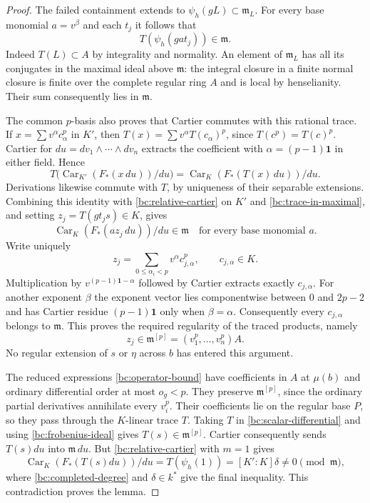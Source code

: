 \begin{proof}
The failed containment extends to
$\psi_h(gL)\subset\mathfrak m_L$.  For every base monomial $a=v^\beta$
and each $t_j$ it follows that
\begin{equation}\label{bc:trace-in-maximal}
                       T(\psi_h(gat_j))\in\mathfrak m.
\end{equation}
Indeed $T(L)\subset A$ by integrality and normality.  An element of
$\mathfrak m_L$ has all its conjugates in the maximal ideal above
$\mathfrak m$: the integral closure in a finite normal closure is
finite over the complete regular ring $A$ and is local by henselianity.
Their sum consequently
lies in $\mathfrak m$.

The common $p$-basis also proves that Cartier commutes with this rational
trace.  If $x=\sum v^\alpha c_\alpha^p$ in $K'$, then
$T(x)=\sum v^\alpha T(c_\alpha)^p$, since $T(c^p)=T(c)^p$.
Cartier for $du=dv_1\wedge\cdots\wedge dv_n$ extracts the coefficient
with $\alpha=(p-1)\mathbf1$ in either field.  Hence
\[
 T\bigl(\operatorname{Car}_{K'}(F_*(x\,du))/du\bigr)
       =\operatorname{Car}_{K}(F_*(T(x)\,du))/du.
\]
Derivations likewise commute with $T$, by uniqueness of their separable
extensions.  Combining this identity with
\eqref{bc:relative-cartier} on $K'$ and
\eqref{bc:trace-in-maximal}, and setting $z_j=T(gt_js)\in K$, gives
\[
 \operatorname{Car}_{K}(F_*(a z_j\,du))/du\in\mathfrak m
                         \quad\text{for every base monomial }a.
\]
Write uniquely
\[
 z_j=\sum_{0\le\alpha_i<p}v^\alpha c_{j,\alpha}^{p},
                         \qquad c_{j,\alpha}\in K.
\]
Multiplication by $v^{(p-1)\mathbf1-\alpha}$ followed by Cartier
extracts exactly $c_{j,\alpha}$.  For another exponent $\beta$ the
exponent vector lies componentwise between $0$ and $2p-2$ and has
Cartier residue $(p-1)\mathbf1$ only when $\beta=\alpha$.
Consequently every $c_{j,\alpha}$ belongs to $\mathfrak m$.  This
proves the required regularity of the traced products, namely
\begin{equation}\label{bc:frobenius-ideal}
                    z_j\in\mathfrak m^{[p]}
                           =(v_1^p,\ldots,v_n^p)A.
\end{equation}
No regular extension of $s$ or $\eta$ across $b$ has entered this
argument.

The reduced expressions \eqref{bc:operator-bound} have coefficients in
$A$ at $\mu(b)$ and ordinary differential order at most $o_g<p$.
They preserve $\mathfrak m^{[p]}$, since the ordinary partial
derivatives annihilate every $v_i^p$.  Their coefficients lie on the
regular base $P$, so they pass through the $K$-linear trace $T$.
Taking $T$ in \eqref{bc:scalar-differential} and using
\eqref{bc:frobenius-ideal} gives $T(s)\in\mathfrak m^{[p]}$.
Cartier consequently sends $T(s)du$ into $\mathfrak m\,du$.
But \eqref{bc:relative-cartier} with $m=1$ gives
\[
 \operatorname{Car}_{K}(F_*(T(s)du))/du
       =T(\psi_h(1))=[K':K]\delta\ne0\pmod{\mathfrak m},
\]
where \eqref{bc:completed-degree} and $\delta\in k^*$ give the final
inequality.  This contradiction proves the lemma.
\end{proof}

